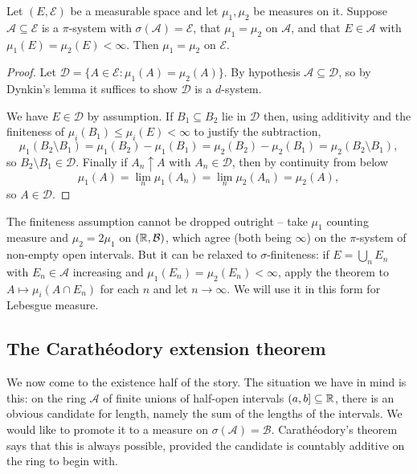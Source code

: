 \documentclass[a4paper]{scrartcl}
\newcommand{\cA}{\mathcal{A}}
\newcommand{\cB}{\mathcal{B}}
\newcommand{\cD}{\mathcal{D}}
\newcommand{\cE}{\mathcal{E}}
\begin{document}
\begin{theorem}\label{thm:uniqueness}
	Let $(E, \cE)$ be a measurable space and let $\mu_1, \mu_2$ be measures on it. Suppose $\cA \subseteq \cE$ is a $\pi$-system with $\sigma(\cA) = \cE$, that $\mu_1 = \mu_2$ on $\cA$, and that $E \in \cA$ with $\mu_1(E) = \mu_2(E) < \infty$. Then $\mu_1 = \mu_2$ on $\cE$.
\end{theorem}
\begin{proof}
	Let $\cD = \{ A \in \cE : \mu_1(A) = \mu_2(A)\}$. By hypothesis $\cA \subseteq \cD$, so by Dynkin's lemma it suffices to show $\cD$ is a $d$-system.

	We have $E \in \cD$ by assumption. If $B_1 \subseteq B_2$ lie in $\cD$ then, using additivity and the finiteness of $\mu_i(B_1) \leq \mu_i(E) < \infty$ to justify the subtraction,
	$$
	\mu_1(B_2 \setminus B_1) = \mu_1(B_2) - \mu_1(B_1) = \mu_2(B_2) - \mu_2(B_1) = \mu_2(B_2 \setminus B_1),
	$$
	so $B_2 \setminus B_1 \in \cD$. Finally if $A_n \uparrow A$ with $A_n \in \cD$, then by continuity from below
	$$
	\mu_1(A) = \lim_n \mu_1(A_n) = \lim_n \mu_2(A_n) = \mu_2(A),
	$$
	so $A \in \cD$.
\end{proof}

\begin{remark}
	The finiteness assumption cannot be dropped outright -- take $\mu_1$ counting measure and $\mu_2 = 2\mu_1$ on $(\R, \cB)$, which agree (both being $\infty$) on the $\pi$-system of non-empty open intervals. But it can be relaxed to $\sigma$-finiteness: if $E = \bigcup_n E_n$ with $E_n \in \cA$ increasing and $\mu_1(E_n) = \mu_2(E_n) < \infty$, apply the theorem to $A \mapsto \mu_i(A \cap E_n)$ for each $n$ and let $n \to \infty$. We will use it in this form for Lebesgue measure.
\end{remark}

\subsection{The Carath\'eodory extension theorem}

We now come to the existence half of the story. The situation we have in mind is this: on the ring $\cA$ of finite unions of half-open intervals $(a,b] \subseteq \mathbb{R}$, there is an obvious candidate for length, namely the sum of the lengths of the intervals. We would like to promote it to a measure on $\sigma(\cA) = \cB$. Carath\'eodory's theorem says that this is always possible, provided the candidate is countably additive on the ring to begin with.
\end{document}
